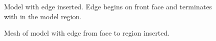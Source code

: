 \documentclass[a4paper, 12pt]{article}
\begin{document}
\begin{figure}[H]
  \centering
  \caption{Model with edge inserted. Edge begins on front face and terminates 
        with in the model region.}
  \label{fig:edge3model}
\end{figure}

\begin{figure}[H]
  \centering
  \caption{Mesh of model with edge from face to region inserted.}
  \label{fig:edge3mesh}
\end{figure}
\end{document}
